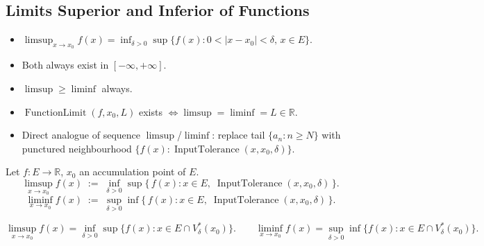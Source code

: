 
\subsection{Limits Superior and Inferior of Functions}
\label{sec:limsup-liminf-functions}

\begin{tcolorbox}[title={Toolkit --- Limits Superior and Inferior of Functions}]
\begin{itemize}
  \item $\limsup_{x\to x_0}f(x)=\inf_{\delta>0}
    \sup\{f(x):0<|x-x_0|<\delta,\,x\in E\}$.
  \item Both always exist in $[-\infty,+\infty]$.
  \item $\limsup\geq\liminf$ always.
  \item $\operatorname{FunctionLimit}(f,x_0,L)$ exists
    $\iff\limsup=\liminf=L\in\mathbb{R}$.
  \item Direct analogue of sequence $\limsup$/$\liminf$: replace tail
    $\{a_n:n\geq N\}$ with punctured neighbourhood
    $\{f(x):\operatorname{InputTolerance}(x,x_0,\delta)\}$.
\end{itemize}
\end{tcolorbox}


\begin{tcolorbox}[title={Definition --- Limits Superior and Inferior}]
\begin{definition}
\label{def:limsup-liminf-function}
Let $f:E\to\mathbb{R}$, $x_0$ an accumulation point of $E$.
\[
  \limsup_{x\to x_0}f(x)
  \;:=\;
  \inf_{\delta>0}
  \sup\bigl\{\,f(x):x\in E,\;\operatorname{InputTolerance}(x,x_0,\delta)\,\bigr\}.
\]
\[
  \liminf_{x\to x_0}f(x)
  \;:=\;
  \sup_{\delta>0}
  \inf\bigl\{\,f(x):x\in E,\;\operatorname{InputTolerance}(x,x_0,\delta)\,\bigr\}.
\]
\end{definition}
\end{tcolorbox}

\begin{remark*}
\[
  \limsup_{x\to x_0}f(x)
  = \inf_{\delta>0}
    \sup\{f(x):x\in E\cap V_\delta^*(x_0)\}.
  \qquad
  \liminf_{x\to x_0}f(x)
  = \sup_{\delta>0}
    \inf\{f(x):x\in E\cap V_\delta^*(x_0)\}.
\]
\end{remark*}

